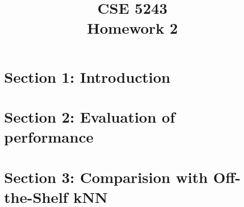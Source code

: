 \documentclass[journal,transmag]{IEEEtran}
\begin{document}
\title{CSE 5243\\Homework 2}
\author{}


\maketitle
\section{Section 1: Introduction}
	
\section{Section 2: Evaluation of performance}
	
\section{Section 3: Comparision with Off-the-Shelf kNN}
	
\end{document}

